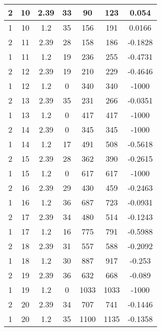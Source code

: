 \documentclass[letterpaper, 12pt]{article}
\begin{document}
\begin{longtable}{|c|c|c|c|c|c|c|}
\hline
2 & 10 & 2.39 & 33 & 90 & 123 & 0.054 \\
\hline
1 & 10 & 1.2 & 35 & 156 & 191 & 0.0166 \\
\hline
2 & 11 & 2.39 & 28 & 158 & 186 & -0.1828 \\
\hline
1 & 11 & 1.2 & 19 & 236 & 255 & -0.4731 \\
\hline
2 & 12 & 2.39 & 19 & 210 & 229 & -0.4646 \\
\hline
1 & 12 & 1.2 & 0 & 340 & 340 & -1000 \\
\hline
2 & 13 & 2.39 & 35 & 231 & 266 & -0.0351 \\
\hline
1 & 13 & 1.2 & 0 & 417 & 417 & -1000 \\
\hline
2 & 14 & 2.39 & 0 & 345 & 345 & -1000 \\
\hline
1 & 14 & 1.2 & 17 & 491 & 508 & -0.5618 \\
\hline
2 & 15 & 2.39 & 28 & 362 & 390 & -0.2615 \\
\hline
1 & 15 & 1.2 & 0 & 617 & 617 & -1000 \\
\hline
2 & 16 & 2.39 & 29 & 430 & 459 & -0.2463 \\
\hline
1 & 16 & 1.2 & 36 & 687 & 723 & -0.0931 \\
\hline
2 & 17 & 2.39 & 34 & 480 & 514 & -0.1243 \\
\hline
1 & 17 & 1.2 & 16 & 775 & 791 & -0.5988 \\
\hline
2 & 18 & 2.39 & 31 & 557 & 588 & -0.2092 \\
\hline
1 & 18 & 1.2 & 30 & 887 & 917 & -0.253 \\
\hline
2 & 19 & 2.39 & 36 & 632 & 668 & -0.089 \\
\hline
1 & 19 & 1.2 & 0 & 1033 & 1033 & -1000 \\
\hline
2 & 20 & 2.39 & 34 & 707 & 741 & -0.1446 \\
\hline
1 & 20 & 1.2 & 35 & 1100 & 1135 & -0.1358 \\
\hline
\end{longtable}
\end{document}
